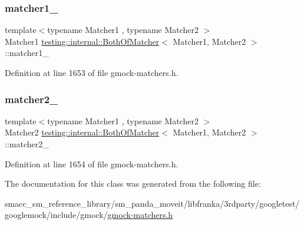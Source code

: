 \subsubsection{\texorpdfstring{matcher1\+\_\+}{matcher1\_}}
{\footnotesize\ttfamily template$<$typename Matcher1 , typename Matcher2 $>$ \\
Matcher1 \hyperlink{classtesting_1_1internal_1_1BothOfMatcher}{testing\+::internal\+::\+Both\+Of\+Matcher}$<$ Matcher1, Matcher2 $>$\+::matcher1\+\_\+\hspace{0.3cm}{\ttfamily [private]}}



Definition at line 1653 of file gmock-\/matchers.\+h.

\mbox{\label{classtesting_1_1internal_1_1BothOfMatcher_a531d417ec0480876070ce9da6e0f71ae}} 
\subsubsection{\texorpdfstring{matcher2\+\_\+}{matcher2\_}}
{\footnotesize\ttfamily template$<$typename Matcher1 , typename Matcher2 $>$ \\
Matcher2 \hyperlink{classtesting_1_1internal_1_1BothOfMatcher}{testing\+::internal\+::\+Both\+Of\+Matcher}$<$ Matcher1, Matcher2 $>$\+::matcher2\+\_\+\hspace{0.3cm}{\ttfamily [private]}}



Definition at line 1654 of file gmock-\/matchers.\+h.



The documentation for this class was generated from the following file\+:\begin{DoxyCompactItemize}
\item 
smacc\+\_\+sm\+\_\+reference\+\_\+library/sm\+\_\+panda\+\_\+moveit/libfranka/3rdparty/googletest/googlemock/include/gmock/\hyperlink{gmock-matchers_8h}{gmock-\/matchers.\+h}\end{DoxyCompactItemize}
